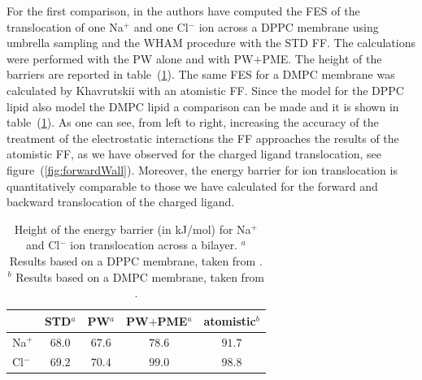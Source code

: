 For the first comparison, in \cite{PW} the authors have computed the \ac{FES} of the translocation of one Na$^+$ 
and one Cl$^-$ ion across a \acs{DPPC} membrane using umbrella sampling and the \ac{WHAM} procedure with the 
\ac{STD} \martini{} \ac{FF}. The calculations were performed with the \ac{PW} alone and with \ac{PW}$+$\ac{PME}. 
The height of the barriers are reported in table~(\ref{tab:ionTranslocation}). The same \ac{FES} for a \acs{DMPC} 
membrane was calculated by Khavrutskii \etal{} \cite{atomisticTranslocation} with an atomistic \ac{FF}. Since the 
\martini{} model for the \acs{DPPC} lipid also model the \acs{DMPC} lipid a comparison can be made and it is shown 
in table~(\ref{tab:ionTranslocation}). As one can see, from left to right, increasing the accuracy of the 
treatment of the electrostatic interactions the \martini{} \ac{FF} approaches the results of the atomistic 
\ac{FF}, as we have observed for the charged ligand translocation, see figure~(\ref{fig:forwardWall}). Moreover, 
the energy barrier for ion translocation is quantitatively comparable to those we have calculated for the forward 
and backward translocation of the charged ligand.
\begin{table}[h!t]
	\centering
	\begin{tabular}{lcccc}
		\toprule
		\,		& STD$^a$ 	& \acs{PW}$^a$ 	& \acs{PW}$+$\acs{PME}$^a$ 	& atomistic$^b$	\\ \toprule
		Na$^+$	& $68.0$& $67.6$	& $78.6$	& $91.7$ 	\\ \midrule
		Cl$^-$	& $69.2$& $70.4$	& $99.0$	& $98.8$	\\ \bottomrule
	\end{tabular}
	\caption{Height of the energy barrier (in kJ/mol) for Na$^+$ and Cl$^-$ ion translocation across a bilayer. $^a$ Results based on a \acs{DPPC} membrane, taken from \cite{PW}. $^b$ Results based on a \acs{DMPC} membrane, taken from \cite{atomisticTranslocation}.}%
	\label{tab:ionTranslocation}
\end{table}

